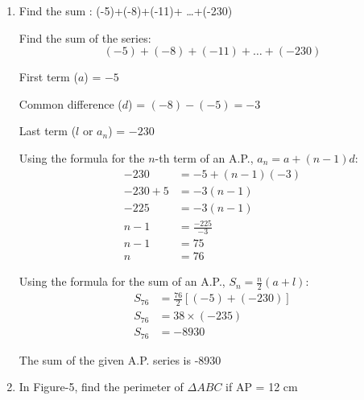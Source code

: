 \begin{enumerate}[label=\thesubsection.\arabic*, ref=\thesubsection.\theenumi]
	$AP + PB=AB ; BQ+QC=BC ; CR+RD=CD ;DS+AS=AD$
	
	$$AB+CD=AP+PB+CR+RD$$
	$$AD+BC= AS+BQ+CQ+DS \implies AP+ PB+CR+RD$$
	
	$$AB+CD=AD+BC$$
	
	Hence proved .
	
	\item 
	Find the sum :
	(-5)+(-8)+(-11)+ \dots +(-230)
	
	\solution 
	Find the sum of the series:
	\[
	(-5) + (-8) + (-11) + \dots + (-230)
	\]
	
	
	First term ($a$) = $-5$
	
	Common difference ($d$) = $(-8) - (-5) = -3$
	
	Last term ($l$ or $a_n$) = $-230$
	
	
	Using the formula for the $n$-th term of an A.P., $a_n = a + (n - 1)d$:
	\begin{align*}
		-230 &= -5 + (n - 1)(-3) \\
		-230 + 5 &= -3(n - 1) \\
		-225 &= -3(n - 1) \\
		n - 1 &= \frac{-225}{-3} \\
		n - 1 &= 75 \\
		n &= 76
	\end{align*}
	
	Using the formula for the sum of an A.P., $S_n = \frac{n}{2}(a + l)$:
	\begin{align*}
		S_{76} &= \frac{76}{2} \left[(-5) + (-230)\right] \\
		S_{76} &= 38 \times (-235) \\
		S_{76} &= -8930
	\end{align*}
	
	The sum of the given A.P. series is -8930
	
	\item 
	In Figure-5, find the perimeter of $\Delta ABC$ if AP = 12 cm
	

\end{enumerate}
